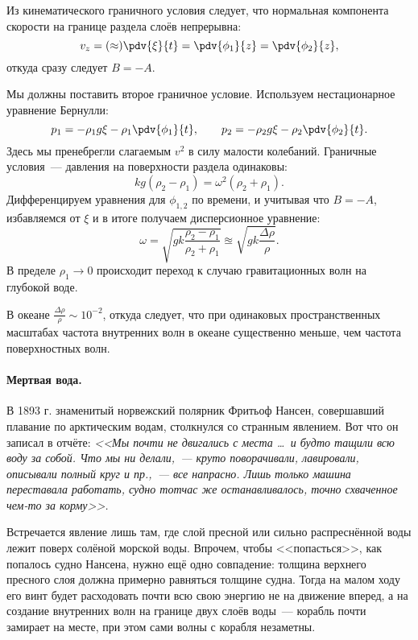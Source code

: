 Из кинематического граничного условия следует, что нормальная компонента скорости на границе раздела слоёв непрерывна:
\begin{equation}
    v_z = (\approx) \pdv{\xi}{t} = \pdv{\phi_1}{z} = \pdv{\phi_2}{z},
\end{equation}
откуда сразу следует $B = -A$.

Мы должны поставить второе граничное условие. Используем нестационарное уравнение Бернулли:
\begin{equation}
    p_1 = -\rho_1 g \xi - \rho_1 \pdv{\phi_1}{t}, \qquad
    p_2 = -\rho_2 g \xi - \rho_2 \pdv{\phi_2}{t}.
\end{equation}
Здесь мы пренебрегли слагаемым $v^2$ в силу малости колебаний.
Граничные условия~--- давления на поверхности раздела одинаковы:
\begin{equation}
    kg(\rho_2-\rho_1) = \omega^2(\rho_2+\rho_1).
\end{equation}
Дифференцируем уравнения для $\phi_{1,2}$ по времени, и учитывая что $B=-A$, избавляемся от $\xi$ и в итоге получаем дисперсионное уравнение:
\begin{equation}
    \omega = \sqrt{gk\frac{\rho_2-\rho_1}{\rho_2+\rho_1}} \approxeq \sqrt{gk\frac{\Delta \rho}{\rho}}.
\end{equation}
В пределе $\rho_1 \to 0$ происходит переход к случаю гравитационных волн на глубокой воде.

В океане $ \frac{\Delta\rho}{\rho}\sim 10^{-2}$, откуда следует, что при одинаковых пространственных масштабах частота внутренних волн в океане существенно меньше, чем частота поверхностных волн.

\paragraph{Мертвая вода.} В 1893 г. знаменитый норвежский полярник Фритьоф Нансен, совершавший плавание по арктическим водам, столкнулся со странным явлением. Вот что он записал в отчёте: \textit{<<Мы почти не двигались с места \dots\, и будто тащили всю воду за собой. Что мы ни делали,~--- круто поворачивали, лавировали, описывали полный круг и пр.,~--- все напрасно. Лишь только машина переставала работать, судно тотчас же останавливалось, точно схваченное чем-то за корму>>.}

Встречается явление лишь там, где слой пресной или
сильно распреснённой воды лежит поверх солёной морской воды.
Впрочем, чтобы <<попасться>>, как попалось судно Нансена, нужно ещё одно
совпадение: толщина верхнего пресного слоя должна примерно
равняться толщине судна. Тогда на малом ходу его винт будет
расходовать почти всю свою энергию не на движение вперед,
а на создание внутренних волн на границе двух слоёв воды~--- корабль
почти замирает на месте, при этом сами волны с корабля незаметны.


